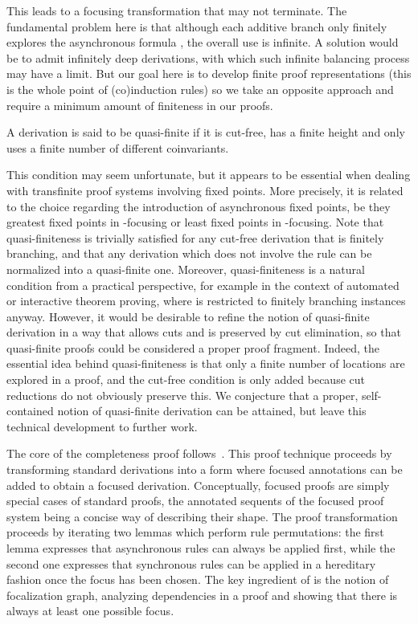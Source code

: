 This leads to a focusing transformation that may not terminate.
The fundamental problem here is that although each additive
branch only finitely explores the asynchronous formula ,
the overall use is infinite.
A solution would be to admit infinitely deep derivations,
with which such infinite balancing process may have a limit.
But our goal here is to develop finite proof representations
(this is the whole point of (co)induction rules)
so we take an opposite approach and require a minimum amount
of finiteness in our proofs.

\begin{definition}
A derivation is said to be quasi-finite if
it is cut-free,
has a finite height
and only uses a finite number of different coinvariants.
\end{definition}

This condition may seem unfortunate, but it appears to be essential
when dealing with transfinite proof systems involving fixed points. More
precisely, it is related to the choice regarding the introduction of
asynchronous fixed points, be they greatest fixed points in -focusing
or least fixed points in -focusing.
Note that quasi-finiteness is trivially satisfied
for any cut-free derivation that is finitely branching,
and that any derivation which does not involve the  rule
can be normalized into a quasi-finite one.
Moreover,
quasi-finiteness is a natural condition from a practical perspective,
for example in the context of automated or interactive theorem proving,
where  is restricted to finitely branching instances anyway.
However, it would be desirable to refine the notion of quasi-finite
derivation in a way that allows cuts and is preserved by cut elimination,
so that quasi-finite proofs could be considered a proper proof fragment.
Indeed, the essential idea behind quasi-finiteness is that
only a finite number of locations are explored in a proof,
and the cut-free condition is only added because cut reductions
do not obviously preserve this.
We conjecture that a proper, self-contained notion of quasi-finite
derivation can be attained,
but leave this technical development to further work.



The core of the completeness proof follows~\cite{miller07cslb}.
This proof technique proceeds by transforming standard derivations
into a form where focused annotations can be added to obtain a focused
derivation. Conceptually, focused proofs are simply special cases
of standard proofs, the annotated sequents of the focused proof system
being a concise way of describing their shape.
The proof transformation proceeds by iterating two lemmas which
perform rule permutations: the first lemma expresses that 
asynchronous rules can always be applied first, while the second one
expresses that synchronous rules can be applied in a hereditary fashion
once the focus has been chosen.
The key ingredient of \cite{miller07cslb} is the notion of focalization
graph, analyzing dependencies in a proof and showing that there is always
at least one possible focus.

